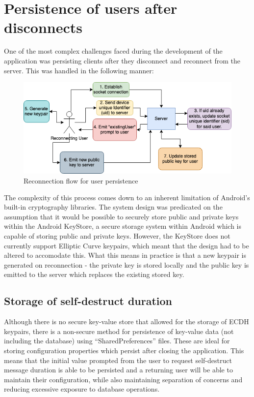 \documentclass{mproj}
\begin{document}
\section{Persistence of users after disconnects}
One of the most complex challenges faced during the development of the application was persisting clients after they disconnect and reconnect from the server. This was handled in the following manner:
\begin{figure}[H]
	\includegraphics[scale=0.6]{images/reconnection-flow.png}
	\caption{Reconnection flow for user persistence}
\end{figure}
The complexity of this process comes down to an inherent limitation of Android's built-in cryptography libraries. The system design was predicated on the assumption that it would be possible to securely store public and private keys within the Android KeyStore\cite{cooijmans2014analysis}, a secure storage system within Android which is capable of storing public and private keys. However, the KeyStore does not currently support Elliptic Curve keypairs, which meant that the design had to be altered to accomodate this. What this means in practice is that a new keypair is generated on reconnection - the private key is stored locally and the public key is emitted to the server which replaces the existing stored key.

\subsection{Storage of self-destruct duration}
Although there is no secure key-value store that allowed for the storage of ECDH keypairs, there is a non-secure method for persistence of key-value data (not including the database) using ``SharedPreferences'' files. These are ideal for storing configuration properties which persist after closing the application. This means that the initial value prompted from the user to request self-destruct message duration is able to be persisted and a returning user will be able to maintain their configuration, while also maintaining separation of concerns and reducing excessive exposure to database operations.
\end{document}
